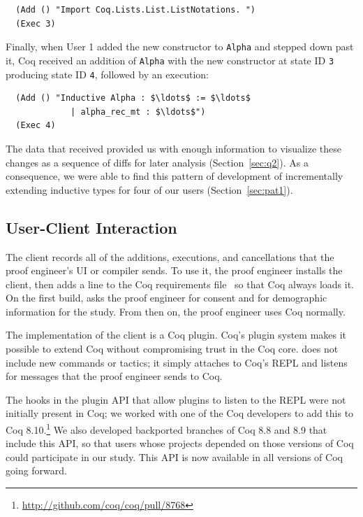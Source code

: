 \begin{lstlisting}
  (Add () "Import Coq.Lists.List.ListNotations. ")
  (Exec 3)
\end{lstlisting}
Finally, when User 1 added the new constructor to \lstinline{Alpha}
and stepped down past it,
Coq received an addition of \lstinline{Alpha} with the new
constructor at state ID  \lstinline{3} producing state ID \lstinline{4}, followed by an execution:

\begin{lstlisting}
  (Add () "Inductive Alpha : $\ldots$ := $\ldots$
             | alpha_rec_mt : $\ldots$")
  (Exec 4)
\end{lstlisting}

The data that \toolname received provided us with enough
information to visualize these changes as a sequence of
diffs for later analysis (Section~\ref{sec:q2}).
As a consequence, we were able to find this pattern of development
of incrementally extending inductive types for four of our users
(Section~\ref{sec:pat1}).

\subsection{User-Client Interaction}
\label{sec:client}

The \toolname client records all of the additions, executions,
and cancellations that the proof engineer's UI or compiler sends.
To use it, the proof engineer installs the client,
then adds a line to the Coq requirements file~\cite{coqrc} so that
Coq always loads it.
On the first build, \toolname asks the proof engineer for consent and
for demographic information for the study.
From then on, the proof engineer uses Coq normally.

The implementation of the client is a Coq plugin.
Coq's plugin system makes it possible to extend
Coq without compromising trust in the Coq core.
\toolname does not include new commands or tactics; it simply attaches
to Coq's REPL and listens for messages that the proof engineer sends to Coq.

The hooks in the plugin API that allow plugins to listen to the REPL
were not initially present in Coq;
we worked with one of the Coq developers
to add this to Coq 8.10.\footnote{\url{http://github.com/coq/coq/pull/8768}}
We also developed backported branches of Coq 8.8 and 8.9 that include
this API, so that users whose projects depended on those
versions of Coq could participate in our study. This API is now available in all
versions of Coq going forward. %

